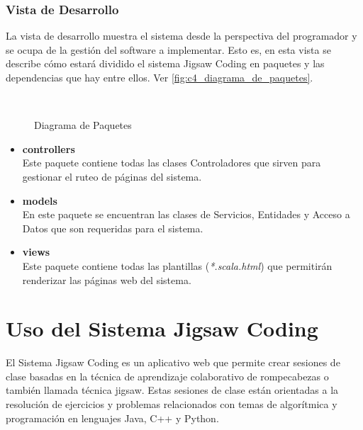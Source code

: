 \subsubsection{Vista de Desarrollo}
La vista de desarrollo muestra el sistema desde la perspectiva del programador y se ocupa de la gestión del software a implementar. Esto es, en esta vista se describe cómo estará dividido el sistema Jigsaw Coding en paquetes y las dependencias que hay entre ellos. Ver \autoref{fig:c4_diagrama_de_paquetes}.
\begin{figure}[!h]
	\centering
	\\
	\caption{Diagrama de Paquetes}\label{fig:c4_diagrama_de_paquetes}
\end{figure}
\begin{itemize}
	\item \textbf{controllers}\\Este paquete contiene todas las clases Controladores que sirven para gestionar el ruteo de páginas del sistema.
	\item \textbf{models}\\En este paquete se encuentran las clases de Servicios, Entidades y Acceso a Datos que son requeridas para el sistema.
	\item \textbf{views}\\Este paquete contiene todas las plantillas (\emph{*.scala.html}) que permitirán renderizar las páginas web del sistema.
\end{itemize}

\section{Uso del Sistema Jigsaw Coding} 
El Sistema Jigsaw Coding es un aplicativo web que permite crear sesiones de clase basadas en la técnica de aprendizaje colaborativo de rompecabezas o también llamada técnica jigsaw. Estas sesiones de clase están orientadas a la resolución de ejercicios y problemas relacionados con temas de algorítmica y programación en lenguajes Java, C++ y Python.\\

